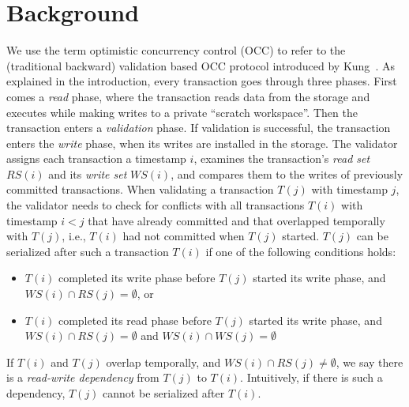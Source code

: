 \section{Background}\label{sec:background}

We use the term optimistic concurrency control (OCC) to refer to the (traditional backward) validation based OCC protocol introduced by Kung~\cite{kung81tods}.
As explained in the introduction, every transaction goes through three phases. First comes a \emph{read} phase, where the transaction reads data from the storage and executes while making writes to a private ``scratch workspace''. Then the transaction enters a \emph{validation} phase. If validation is successful, the transaction enters the \emph{write} phase, when its writes are installed in the storage. 
The validator assigns each transaction a timestamp $i$, examines the transaction's \emph{read set} $RS(i)$ and its \emph{write set} $WS(i)$, and compares them to the writes of previously committed transactions. 
When validating a transaction $T(j)$ with timestamp $j$, the validator needs to check for conflicts with all transactions $T(i)$ with timestamp $i<j$ that have already committed and that overlapped temporally with $T(j)$, i.e., $T(i)$ had not committed when $T(j)$ started. 
$T(j)$ can be serialized after such a transaction $T(i)$ if one of the following conditions holds:
\begin{itemize}[leftmargin=*, nolistsep]
	\item $T(i)$ completed its write phase before $T(j)$ started its write phase, and $WS(i) \cap RS(j) = \emptyset$, or
	\item $T(i)$ completed its read phase before $T(j)$ started its write phase, and $WS(i) \cap RS(j) = \emptyset$ and $WS(i) \cap WS(j) = \emptyset$
\end{itemize}
If $T(i)$ and $T(j)$ overlap temporally, and $WS(i) \cap RS(j) \neq \emptyset$, we say there is a \emph{read-write dependency} from $T(j)$ to $T(i)$. Intuitively, if there is such a dependency, $T(j)$ cannot be serialized after $T(i)$. 

